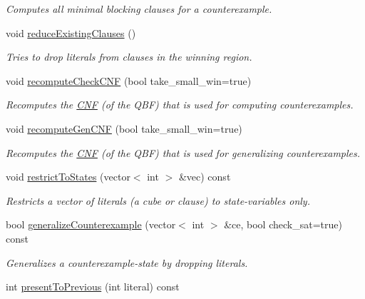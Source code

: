 \begin{DoxyCompactItemize}
\begin{DoxyCompactList}\small\item\em Computes all minimal blocking clauses for a counterexample. \end{DoxyCompactList}\item 
void \hyperlink{classLearnSynthQBFInd_a0f02719c7a3b6d928337f310dabff478}{reduce\-Existing\-Clauses} ()
\begin{DoxyCompactList}\small\item\em Tries to drop literals from clauses in the winning region. \end{DoxyCompactList}\item 
void \hyperlink{classLearnSynthQBFInd_a5c7c552e1e8db8dd80e53778d42e9627}{recompute\-Check\-C\-N\-F} (bool take\-\_\-small\-\_\-win=true)
\begin{DoxyCompactList}\small\item\em Recomputes the \hyperlink{classCNF}{C\-N\-F} (of the Q\-B\-F) that is used for computing counterexamples. \end{DoxyCompactList}\item 
void \hyperlink{classLearnSynthQBFInd_ae1ed892480cb3404d5ff1e7ee35b5a9c}{recompute\-Gen\-C\-N\-F} (bool take\-\_\-small\-\_\-win=true)
\begin{DoxyCompactList}\small\item\em Recomputes the \hyperlink{classCNF}{C\-N\-F} (of the Q\-B\-F) that is used for generalizing counterexamples. \end{DoxyCompactList}\item 
void \hyperlink{classLearnSynthQBFInd_a75417fbbe8b1bedbd1ef158299606929}{restrict\-To\-States} (vector$<$ int $>$ \&vec) const 
\begin{DoxyCompactList}\small\item\em Restricts a vector of literals (a cube or clause) to state-\/variables only. \end{DoxyCompactList}\item 
bool \hyperlink{classLearnSynthQBFInd_a5a34501e485a063d8120a2a79c39d9c9}{generalize\-Counterexample} (vector$<$ int $>$ \&ce, bool check\-\_\-sat=true) const 
\begin{DoxyCompactList}\small\item\em Generalizes a counterexample-\/state by dropping literals. \end{DoxyCompactList}\item 
int \hyperlink{classLearnSynthQBFInd_a106c202c2855e1d83e0074674fef51a9}{present\-To\-Previous} (int literal) const 

\end{DoxyCompactItemize}
